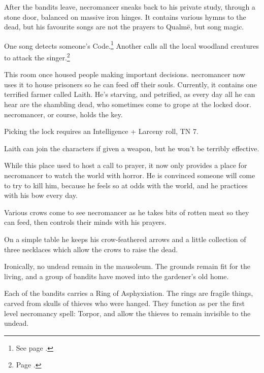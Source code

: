 \begin{multicols}{2}
After the bandits leave, \gls{necromancer} sneaks back to his private study, through a stone door, balanced on massive iron hinges.  It contains various hymns to the dead, but his favourite songs are not the prayers to Qualm\"{e}, but song magic.

One song detects someone's Code.\footnote{See page \pageref{chokingsong}.}
Another calls all the local woodland creatures to attack the singer.\footnote{Page \pageref{medalofheroism}.}


This room once housed people making important decisions.  \Gls{necromancer} now uses it to house prisoners so he can feed off their souls.
Currently, it contains one terrified farmer called Laith.
He's starving, and petrified, as every day all he can hear are the shambling dead, who sometimes come to grope at the locked door.
\Gls{necromancer}, or course, holds the key.

Picking the lock requires an Intelligence + Larceny roll, TN 7.

Laith can join the characters if given a weapon, but he won't be terribly effective.



While this place used to host a call to prayer, it now only provides a place for \gls{necromancer} to watch the world with horror.  He is convinced someone will come to try to kill him, because he feels so at odds with the world, and he practices with his bow every day.

Various crows come to see \gls{necromancer} as he takes bits of rotten meat so they can feed, then controls their minds with his prayers.

On a simple table he keeps his crow-feathered arrows and a little collection of three necklaces which allow the crows to raise the dead.


\thenecromancer


Ironically, no undead remain in the mausoleum.  The grounds remain fit for the living, and a group of bandits have moved into the gardener's old home.

Each of the bandits carries a Ring of Asphyxiation.
The rings are fragile things, carved from skulls of thieves who were hanged.
They function as per the first level necromancy spell: Torpor, and allow the thieves to remain invisible to the undead.


\end{multicols}
